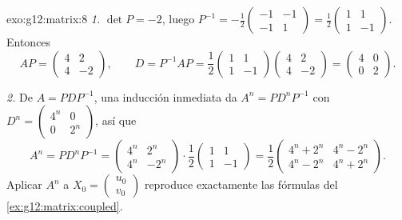 \begin{solution}{exo:g12:matrix:8}
\emph{1.} $\det P = -2$, luego
$P^{-1} = -\frac12\begin{pmatrix} -1 & -1\\ -1 & 1\end{pmatrix}
= \frac12\begin{pmatrix} 1 & 1\\ 1 & -1\end{pmatrix}$. Entonces
\[
AP = \begin{pmatrix} 4 & 2\\ 4 & -2 \end{pmatrix}, \qquad
D = P^{-1}AP = \frac12\begin{pmatrix} 1&1\\1&-1\end{pmatrix}
\begin{pmatrix} 4&2\\4&-2\end{pmatrix}
= \begin{pmatrix} 4 & 0\\ 0 & 2\end{pmatrix}.
\]

\emph{2.} De $A = PDP^{-1}$, una inducción inmediata da
$A^n = PD^nP^{-1}$ con
$D^n = \begin{pmatrix} 4^n & 0\\ 0 & 2^n\end{pmatrix}$, así que
\[
A^n = P D^n P^{-1}
= \begin{pmatrix} 4^n & 2^n\\ 4^n & -2^n\end{pmatrix}\cdot
\frac12\begin{pmatrix} 1&1\\1&-1\end{pmatrix}
= \frac12\begin{pmatrix} 4^n + 2^n & 4^n - 2^n\\
4^n - 2^n & 4^n + 2^n\end{pmatrix}.
\]
Aplicar $A^n$ a $X_0 = \begin{pmatrix} u_0\\v_0\end{pmatrix}$ reproduce
exactamente las fórmulas del \cref{ex:g12:matrix:coupled}.
\end{solution}

